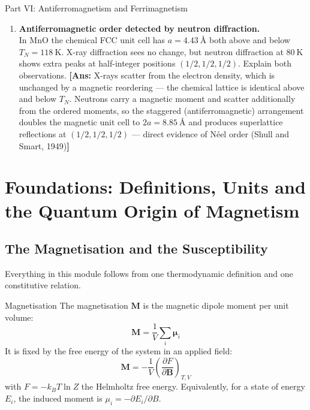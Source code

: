 \documentclass[11pt,a4paper]{article}
\newcommand{\vb}[1]{\mathbf{#1}}
\newcommand{\Ang}{\text{\AA}}
\begin{document}
\begin{assignmentbox}{Part VI: Antiferromagnetism and Ferrimagnetism}
\begin{enumerate}[label=\textbf{VI.\arabic*.}, leftmargin=*]
    \item \textbf{Antiferromagnetic order detected by neutron diffraction.}\\
    In $\text{MnO}$ the chemical FCC unit cell has $a = 4.43\ \Ang$ both above and below $T_N = 118\ \mathrm{K}$. X-ray diffraction sees no change, but neutron diffraction at $80\ \mathrm{K}$ shows extra peaks at half-integer positions $(1/2,1/2,1/2)$. Explain both observations.
    \textbf{[Ans:} X-rays scatter from the electron density, which is unchanged by a magnetic reordering --- the chemical lattice is identical above and below $T_N$. Neutrons carry a magnetic moment and scatter additionally from the ordered moments, so the staggered (antiferromagnetic) arrangement doubles the magnetic unit cell to $2a = 8.85\ \Ang$ and produces superlattice reflections at $(1/2,1/2,1/2)$ --- direct evidence of N\'eel order (Shull and Smart, 1949)\textbf{]}

\end{enumerate}
\end{assignmentbox}

\clearpage
\section{Foundations: Definitions, Units and the Quantum Origin of Magnetism}
\label{ch:foundations}

\subsection{The Magnetisation and the Susceptibility}

Everything in this module follows from one thermodynamic definition and one constitutive relation.

\begin{definitionbox}{Magnetisation}
The magnetisation $\vb{M}$ is the magnetic dipole moment per unit volume:
\begin{equation}
    \vb{M} = \frac{1}{V}\sum_i \boldsymbol{\mu}_i
    \label{eq:magdef}
\end{equation}
It is fixed by the free energy of the system in an applied field:
\begin{equation}
    \vb{M} = -\frac{1}{V}\left(\frac{\partial F}{\partial \vb{B}}\right)_{T,V}
    \label{eq:magfree}
\end{equation}
with $F = -k_BT\ln Z$ the Helmholtz free energy. Equivalently, for a state of energy $E_i$, the induced moment is $\mu_i = -\partial E_i/\partial B$.
\end{definitionbox}
\end{document}
